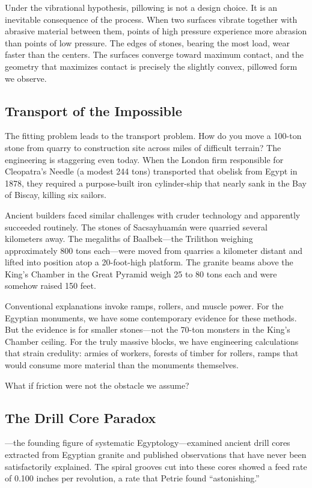 \documentclass[11pt]{article}
\begin{document}
Under the vibrational hypothesis, pillowing is not a design choice. It is an inevitable consequence of the process. When two surfaces vibrate together with abrasive material between them, points of high pressure experience more abrasion than points of low pressure. The edges of stones, bearing the most load, wear faster than the centers. The surfaces converge toward maximum contact, and the geometry that maximizes contact is precisely the slightly convex, pillowed form we observe.

\subsection{Transport of the Impossible}

The fitting problem leads to the transport problem. How do you move a 100-ton stone from quarry to construction site across miles of difficult terrain? The engineering is staggering even today. When the London firm responsible for Cleopatra's Needle (a modest 244 tons) transported that obelisk from Egypt in 1878, they required a purpose-built iron cylinder-ship that nearly sank in the Bay of Biscay, killing six sailors.

Ancient builders faced similar challenges with cruder technology and apparently succeeded routinely. The stones of Sacsayhuamán were quarried several kilometers away. The megaliths of Baalbek---the Trilithon weighing approximately 800 tons each---were moved from quarries a kilometer distant and lifted into position atop a 20-foot-high platform. The granite beams above the King's Chamber in the Great Pyramid weigh 25 to 80 tons each and were somehow raised 150 feet.

Conventional explanations invoke ramps, rollers, and muscle power. For the Egyptian monuments, we have some contemporary evidence for these methods. But the evidence is for smaller stones---not the 70-ton monsters in the King's Chamber ceiling. For the truly massive blocks, we have engineering calculations that strain credulity: armies of workers, forests of timber for rollers, ramps that would consume more material than the monuments themselves.

What if friction were not the obstacle we assume?

\subsection{The Drill Core Paradox}

\citet{Petrie1883}---the founding figure of systematic Egyptology---examined ancient drill cores extracted from Egyptian granite and published observations that have never been satisfactorily explained. The spiral grooves cut into these cores showed a feed rate of 0.100 inches per revolution, a rate that Petrie found ``astonishing.''
\end{document}
